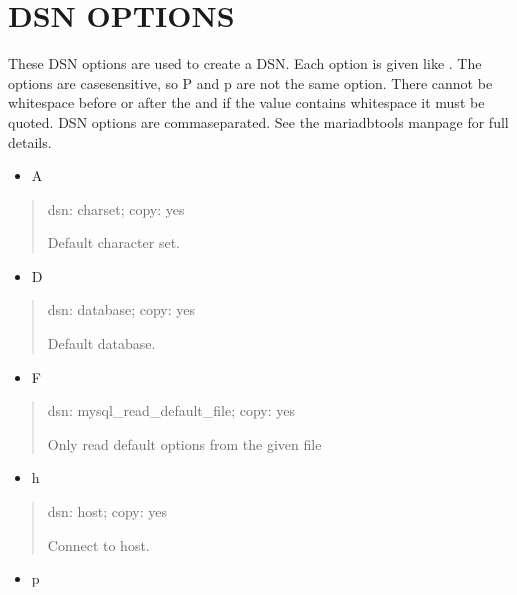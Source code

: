 \documentclass[letterpaper,10pt,english]{sphinxmanual}
\begin{document}
\section{DSN OPTIONS}
\label{\detokenize{mariadb-config-diff:dsn-options}}
These DSN options are used to create a DSN.  Each option is given like
.  The options are case\sphinxhyphen{}sensitive, so P and p are not the
same option.  There cannot be whitespace before or after the \sphinxcode{\sphinxupquote{=}} and
if the value contains whitespace it must be quoted.  DSN options are
comma\sphinxhyphen{}separated.  See the mariadb\sphinxhyphen{}tools manpage for full details.
\begin{itemize}
\item {} 
A

\end{itemize}
\begin{quote}

dsn: charset; copy: yes

Default character set.
\end{quote}
\begin{itemize}
\item {} 
D

\end{itemize}
\begin{quote}

dsn: database; copy: yes

Default database.
\end{quote}
\begin{itemize}
\item {} 
F

\end{itemize}
\begin{quote}

dsn: mysql\_read\_default\_file; copy: yes

Only read default options from the given file
\end{quote}
\begin{itemize}
\item {} 
h

\end{itemize}
\begin{quote}

dsn: host; copy: yes

Connect to host.
\end{quote}
\begin{itemize}
\item {} 
p

\end{itemize}
\end{document}
